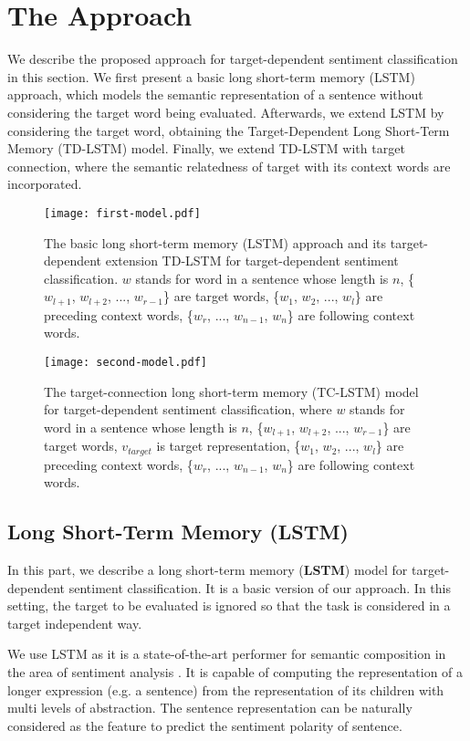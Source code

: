 \documentclass[11pt]{article}
\begin{document}
\section{The Approach}
We describe the proposed approach for target-dependent sentiment classification in this section. 
We first present a basic long short-term memory (LSTM) approach, which models the semantic representation of a sentence without considering the target word being evaluated.
Afterwards, we extend LSTM by considering the target word, obtaining the Target-Dependent Long Short-Term Memory (TD-LSTM) model.
Finally, we extend TD-LSTM with target connection, where the semantic relatedness of target with its context words are incorporated.

\begin{figure*}[t]
	\centering
	\texttt{[image: first-model.pdf]}
	\caption{The basic long short-term memory (LSTM) approach and its target-dependent extension TD-LSTM for target-dependent sentiment classification. $w$ stands for word in a sentence whose length is $n$, \{$w_{l+1}$, $w_{l+2}$, ..., $w_{r-1}$\} are target words, \{$w_{1}$, $w_{2}$, ..., $w_{l}$\} are preceding context words, \{$w_{r}$, ..., $w_{n-1}$, $w_n$\} are following context words.}
	\label{fig:lstm-bilstm}
\end{figure*}

\begin{figure*}[t]
	\centering
	\texttt{[image: second-model.pdf]}
	\caption{The target-connection long short-term memory (TC-LSTM) model for target-dependent sentiment classification, where $w$ stands for word in a sentence whose length is $n$, \{$w_{l+1}$, $w_{l+2}$, ..., $w_{r-1}$\} are target words, $v_{target}$ is target representation, \{$w_{1}$, $w_{2}$, ..., $w_{l}$\} are preceding context words, \{$w_{r}$, ..., $w_{n-1}$, $w_n$\} are following context words.}
	\label{fig:framework}
\end{figure*}

\subsection{Long Short-Term Memory (LSTM)}
In this part, we describe a long short-term memory (\textbf{LSTM}) model for target-dependent sentiment classification.
It is a basic version of our approach.
In this setting, the target to be evaluated is ignored so that the task is considered in a target independent way. 

We use LSTM as it is a state-of-the-art performer for semantic composition in the area of sentiment analysis \cite{Li2015a,Tang2015}. 
It is capable of computing the representation of a longer expression (e.g. a sentence) from the representation of its children with multi levels of abstraction.
The sentence representation can be naturally considered as the feature to predict the sentiment polarity of sentence. 
\end{document}
